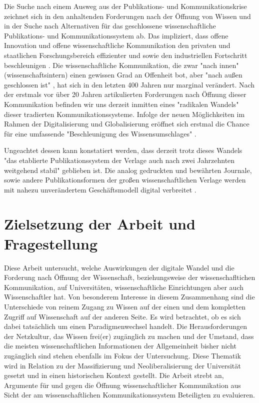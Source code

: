 Die Suche nach einem Ausweg aus der Publikations- und Kommunikationskrise zeichnet sich in den anhaltenden Forderungen nach der Öffnung von Wissen und in der Suche nach Alternativen für das geschlossene wissenschaftliche Publikations- und Kommunikationssystem ab. Das impliziert, dass offene Innovation und offene wissenschaftliche Kommunikation den privaten und staatlichen Forschungsbereich effizienter und sowie den industriellen Fortschritt beschleunigen \cite{cite:7}. 
Die wissenschaftliche Kommunikation, die zwar "nach innen" (wissenschaftsintern) einen gewissen Grad an Offenheit bot, aber "nach außen geschlossen ist" \cite{kelty_2004}, hat sich in den letzten 400 Jahren nur marginal verändert.
Nach der erstmals vor über 20 Jahren artikulierten Forderungen nach Öffnung dieser Kommunikation befinden wir uns derzeit inmitten eines "radikalen Wandels" \cite{poynder_2011_suber} dieser tradierten Kommunikationssysteme. Infolge der neuen Möglichkeiten im Rahmen der Digitalisierung und Globalisierung \cite{mcluhan_1963_gutenberg} eröffnet sich erstmal die Chance für eine umfassende "Beschleunigung des Wissensumschlages" \cite{Wenzel_2003}.

Ungeachtet dessen kann konstatiert werden, dass derzeit trotz dieses Wandels "das etablierte Publikationssystem der Verlage auch nach zwei Jahrzehnten weitgehend stabil" \cite{Hanekop_2014} geblieben ist. Die analog gedruckten und bewährten Journale, sowie andere Publikationsformen der großen wissenschaftlichen Verlage werden mit nahezu unverändertem Geschäftsmodell digital verbreitet \cite{Hanekop_2014} \cite{boai_2012}.

\section{Zielsetzung der Arbeit und Fragestellung} 

Diese Arbeit untersucht, welche Auswirkungen der digitale Wandel und die Forderung nach Öffnung der Wissenschaft, beziehungsweise der wissenschafltichen Kommunikation, auf Universitäten, wissenschaftliche Einrichtungen aber auch Wissenschaftler hat. Von besonderem Interesse in diesem Zusammenhang sind die Unterschiede von reinem Zugang zu Wissen auf der einen und dem kompletten Zugriff auf Wissenschaft auf der anderen Seite. Es wird betrachtet, ob es sich dabei tatsächlich um einen Paradigmenwechsel handelt. Die Herausforderungen der Netzkultur, das Wissen frei(er) zugänglich zu machen und der Umstand, dass die meisten wissenschaftlichen Informationen der Allgemeinheit bisher nicht zugänglich sind \cite{cite:6} stehen ebenfalls im Fokus der Untersuchung. Diese Thematik wird in Relation zu der Massifizierung und Neoliberalisierung der Universität gesetzt und in einen historischen Kontext gestellt. Die Arbeit strebt an, Argumente für und gegen die Öffnung wissenschaftlicher Kommunikation aus Sicht der am wissenschaftlichen Kommunikationssystem Beteiligten zu evaluieren.

